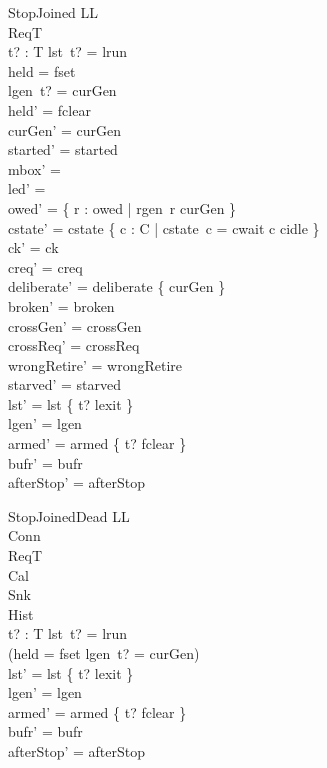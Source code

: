 \documentclass[a4paper,10pt,fleqn]{article}
\begin{document}
\begin{schema}{StopJoined}
  \Delta LL \\
  \Xi ReqT \\
  t? : T
\where
  lst~t? = lrun \\
  held = fset \\
  lgen~t? = curGen \\
  held' = fclear \\
  curGen' = curGen \\
  started' = started \\
  mbox' = \emptyset \\
  led' = \emptyset \\
  owed' = \{ r : owed | rgen~r \neq curGen \} \\
  cstate' = cstate \oplus \{ c : C | cstate~c = cwait \spot c \mapsto cidle \} \\
  ck' = ck \\
  creq' = creq \\
  deliberate' = deliberate \cup \{ curGen \} \\
  broken' = broken \\
  crossGen' = crossGen \\
  crossReq' = crossReq \\
  wrongRetire' = wrongRetire \\
  starved' = starved \\
  lst' = lst \oplus \{ t? \mapsto lexit \} \\
  lgen' = lgen \\
  armed' = armed \oplus \{ t? \mapsto fclear \} \\
  bufr' = bufr \\
  afterStop' = afterStop
\end{schema}

\begin{schema}{StopJoinedDead}
  \Delta LL \\
  \Xi Conn \\
  \Xi ReqT \\
  \Xi Cal \\
  \Xi Snk \\
  \Xi Hist \\
  t? : T
\where
  lst~t? = lrun \\
  \lnot (held = fset \land lgen~t? = curGen) \\
  lst' = lst \oplus \{ t? \mapsto lexit \} \\
  lgen' = lgen \\
  armed' = armed \oplus \{ t? \mapsto fclear \} \\
  bufr' = bufr \\
  afterStop' = afterStop
\end{schema}
\end{document}
